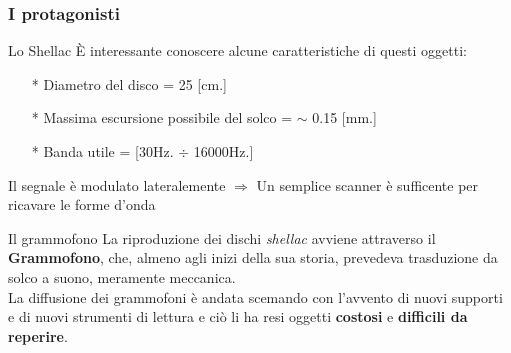 \begin{frame}

\frametitle{I protagonisti}

\begin{block}{Lo Shellac}
\`E interessante conoscere alcune caratteristiche di questi oggetti:
\begin{itemize}
\item[*]Diametro del disco = 25 [cm.]
\item[*]Massima escursione possibile del solco = $\sim$ 0.15 [mm.]
\item[*]Banda utile = [30Hz. $\div$ 16000Hz.]
\end{itemize}
Il segnale è modulato lateralemente $\Rightarrow$ Un semplice scanner è 
sufficente per ricavare le forme d'onda
\end{block}

\begin{block}{Il grammofono}
La riproduzione dei dischi \emph{shellac} avviene attraverso il \textbf{Grammofono},
che, almeno agli inizi della sua storia, prevedeva trasduzione da solco
a suono, meramente meccanica.\\
La diffusione dei grammofoni è andata scemando con l'avvento di nuovi supporti
e di nuovi strumenti di lettura e ciò li ha resi oggetti \textbf{costosi}
e \textbf{difficili da reperire}.
\end{block}

\end{frame}


